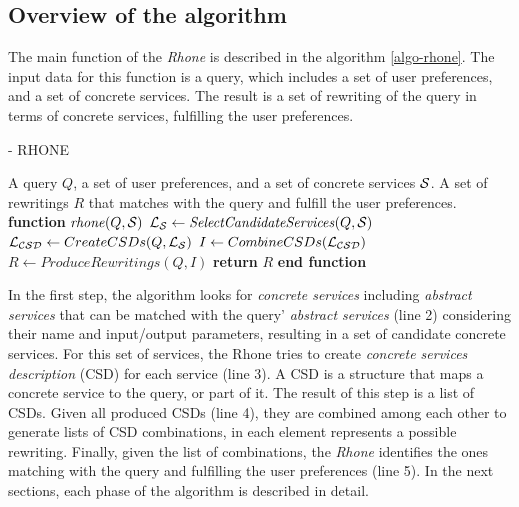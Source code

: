 \subsection{Overview of the algorithm}
The main function of the \textit{Rhone} is described in the algorithm
\ref{algo-rhone}.
The input data for this function is a query, which includes a set of user preferences, and a set of concrete services. The result is a set of rewriting of the query in terms of concrete services, fulfilling the user preferences.

\begin{algorithm}
\small
\caption{ - RHONE}
\label{algo-rhone}
\begin{algorithmic}[1]
\REQUIRE A query $Q$, a set of user preferences, and a set of concrete services $\hbox{${\cal S}$}$.
\ENSURE A set of rewritings $R$ that matches with the query and fulfill the user preferences.
\STATE \textbf{function} $\mathit{rhone} (Q, \hbox{${\cal S}$})$
 \STATE  $\hbox{${\cal L_{S}}$} \leftarrow \mathit{SelectCandidateServices}(Q, \hbox{${\cal S}$})$ \label{rhone:buildPCD}
 \STATE  $\hbox{${\cal L_{CSD}}$} \leftarrow CreateCSDs(Q, \hbox{${\cal L_{S}}$})$
 \STATE  $I \leftarrow CombineCSDs(\hbox{${\cal L_{CSD}}$})$
 \STATE $R\leftarrow ProduceRewritings(Q, I)$
    \STATE \textbf{return} $R$
\STATE \textbf{end function}
\end{algorithmic}
\end{algorithm}

In the first step, the algorithm looks for \textit{concrete services} including \textit{abstract services} that 
can be matched with the query' \textit{abstract services} (line 2) considering their name and input/output parameters, resulting in a set of candidate concrete
services. For this set of services, the Rhone tries to create 
\textit{concrete services description} (CSD) for each service (line 3). 
A CSD is a structure that maps a concrete service to the query, or part of it. 
The  result of this step is a list of CSDs.
Given all produced CSDs  (line 4), they are combined among each other to
generate lists of CSD combinations, in each element represents a possible
rewriting.
Finally, given the list of combinations, the \textit{Rhone} identifies the
ones matching with the query and fulfilling the user preferences (line 5).
In the next sections, each phase of the algorithm is described in detail. 

